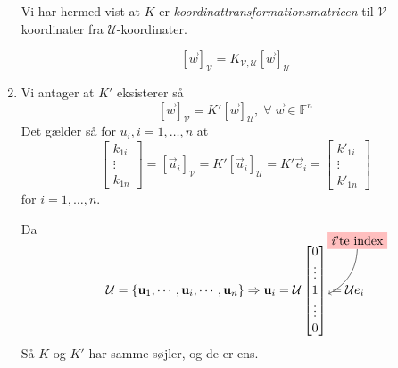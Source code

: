 \begin{bevis}
\begin{enumerate}
			Vi har hermed vist at $K$ er \emph{koordinattransformationsmatricen} til 
			$\mathcal{V}$-koordinater fra $\mathcal{U}$-koordinater.

			\[
				[ \vec{w} ]_\mathcal{V} = K_{\mathcal{V},\mathcal{U}} [ \vec{w}
				]_\mathcal{U}
			\]
		\item Vi antager at $K'$ eksisterer så
			\[
				[\vec{w}]_\mathcal{V} = K'[\vec{w}]_\mathcal{U}, \;\forall\; \vec{w} \in
				\mathbb{F}^n
			\]
			Det gælder så for $u_i, i = 1, \ldots, n$ at
			\[
				\begin{bmatrix}
					k_{1i}\\
					\vdots\\
					k_{1n}
				\end{bmatrix}
				=
				[\vec{u}_i]_\mathcal{V} = K'[\vec{u}_i]_\mathcal{U} = K'\vec{e}_i =
				\begin{bmatrix}
					k'_{1i}\\
					\vdots\\
					k'_{1n}
				\end{bmatrix}
			\]
			for $i = 1, \ldots, n$.

			Da 
			$$
			\mathcal{U} = \{\vec{u}_1, \cdots, \vec{u}_i, \cdots, \vec{u}_n\}
			\Ra \vec{u}_i = \mathcal{U}
			\begin{bmatrix}
				0\\
				\vdots\\
				1 \tikz[baseline=-.5ex] \node[coordinate] (ith){};\\
				\vdots\\
				0
			\end{bmatrix}
			\tikz[overlay]{
				\node[fill=red!25] (ith1) at (0.8,1.5) {\textit{i}'te index};
				\path[->] (ith1) edge [bend left] (ith);
			}
			= \mathcal{U}e_i
			$$
			Så $K$ og $K'$ har samme søjler, og de er ens.
	\end{enumerate}
\end{bevis}
